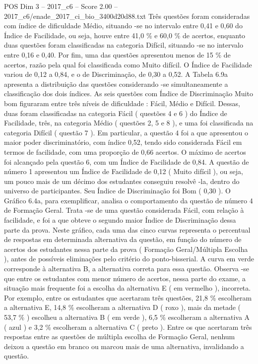 \begin{textsample}{POS Dim 3 – 2017\_c6 – Score 2.00 – 2017\_c6/enade\_2017\_ci\_bio\_3400d20d88.txt}
Três questões foram consideradas com índice de dificuldade Médio, situando -se no intervalo entre 0,41 e 0,60 do Índice de Facilidade, ou seja, houve entre 41,0 \% e 60,0 \% de acertos, enquanto duas questões foram classificadas na categoria Difícil, situando -se no intervalo entre 0,16 e 0,40.
Por fim, uma das questões apresentou menos de 15 \% de acertos, razão pela qual foi classificada como Muito difícil.
O Índice de Facilidade variou de 0,12 a 0,84, e o de Discriminação, de 0,30 a 0,52.
A Tabela 6.9a apresenta a distribuição das questões considerando -se simultaneamente a classificação dos dois índices.
As seis questões com Índice de Discriminação Muito bom figuraram entre três níveis de dificuldade : Fácil, Médio e Difícil.
Dessas, duas foram classificadas na categoria Fácil ( questões 4 e 6 ) do Índice de Facilidade, três, na categoria Médio ( questões 2, 5 e 8 ), e uma foi classificada na categoria Difícil ( questão 7 ).
Em particular, a questão 4 foi a que apresentou o maior poder discriminatório, com índice 0,52, tendo sido considerada Fácil em termos de facilidade, com uma proporção de 0,66 acertos.
O máximo de acertos foi alcançado pela questão 6, com um Índice de Facilidade de 0,84.
A questão de número 1 apresentou um Índice de Facilidade de 0,12 ( Muito difícil ), ou seja, um pouco mais de um décimo dos estudantes conseguiu resolvê -la, dentro do universo de participantes.
Seu Índice de Discriminação foi Bom ( 0,30 ).
O Gráfico 6.4a, para exemplificar, analisa o comportamento da questão de número 4 de Formação Geral.
Trata -se de uma questão considerada Fácil, com relação à facilidade, e foi a que obteve o segundo maior Índice de Discriminação dessa parte da prova.
Neste gráfico, cada uma das cinco curvas representa o percentual de respostas em determinada alternativa da questão, em função do número de acertos dos estudantes nessa parte da prova ( Formação Geral/Múltipla Escolha ), antes de possíveis eliminações pelo critério do ponto-bisserial.
A curva em verde corresponde à alternativa B, a alternativa correta para essa questão.
Observa -se que entre os estudantes com menor número de acertos, nessa parte do exame, a situação mais frequente foi a escolha da alternativa E ( em vermelho ), incorreta.
Por exemplo, entre os estudantes que acertaram três questões, 21,8 \% escolheram a alternativa E, 14,8 \% escolheram a alternativa D ( roxo ), mais da metade ( 53,7 \% ) escolheu a alternativa B ( em verde ), 6,5 \% escolheram a alternativa A ( azul ) e 3,2 \% escolheram a alternativa C ( preto ).
Entre os que acertaram três respostas entre as questões de múltipla escolha de Formação Geral, nenhum deixou a questão em branco ou marcou mais de uma alternativa, invalidando a questão.

\end{textsample}
